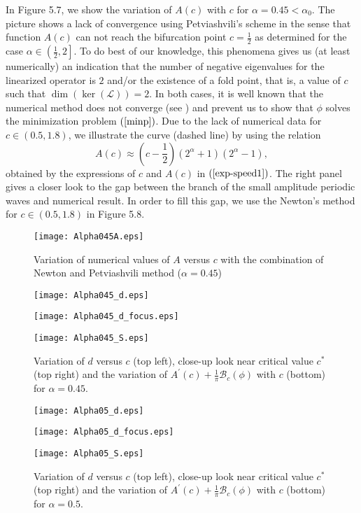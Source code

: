 \documentclass[12pt,reqno]{amsart}
\newcommand{\2}{L^2_{per}(0, T)}
\numberwithin{equation}{section}
\numberwithin{figure}{section}
\begin{document}
In Figure 5.7, we show the variation of $A(c)$ with $c$ for $\alpha=0.45 <\alpha_0$. The picture shows a lack of convergence using Petviashvili's scheme in the sense that function $A(c)$ can not reach the bifurcation point $c=\frac{1}{2}$ as determined for the case $\alpha\in\left(\frac{1}{2},2\right]$. To do best of our knowledge, this phenomena gives us (at least numerically) an indication that the number of negative eigenvalues for the linearized operator is $2$ and/or the existence of a fold point, that is, a value of $c$ such that $\dim(\ker(\mathcal{L}))=2$. In both cases, it is well known that the numerical method does not converge  (see \cite{LP, NPL,PS}) and prevent us to show that $\phi$ solves the minimization problem $(\ref{minp})$. Due to the lack of numerical data for $c\in (0.5, 1.8)$, we illustrate the curve (dashed line) by using  the
relation
\begin{equation}
A(c)\approx \left(c-\frac{1}{2}\right) (2^{\alpha}+1) (2^{\alpha}-1),  \label{rel}
\end{equation}
obtained by the expressions of $c$ and $A(c)$ in $(\ref{exp-speed1})$. The right panel gives a closer look to the gap between the branch of the small amplitude periodic waves and numerical result.   In order to fill this gap, we use the Newton's method for $c\in (0.5, 1.8)$ in Figure 5.8.
\begin{figure}
 \centering
 \texttt{[image: Alpha045A.eps]}
  \caption{Variation of numerical values of  $A$ versus $c$ with the combination of Newton and Petviashvili method ($\alpha=0.45$)}
\end{figure}

\begin{figure}[]
\begin{minipage}[t]{0.49\linewidth}
   \texttt{[image: Alpha045\_d.eps]}
 \end{minipage}
  \begin{minipage}[t]{0.49\linewidth}
   \texttt{[image: Alpha045\_d\_focus.eps]}
 \end{minipage}
 \centering
 \texttt{[image: Alpha045\_S.eps]}
 \caption{Variation of    $d$ versus $c$ (top left),  close-up look near critical value $c^*$   (top right) and the variation of $A^{\prime}(c)+\frac{1}{\pi} {\mathcal B}_c(\phi)$ with $c$ (bottom)  for $\alpha=0.45$.}
\end{figure}

\begin{figure}[]
\begin{minipage}[t]{0.49\linewidth}
   \texttt{[image: Alpha05\_d.eps]}
 \end{minipage}
  \begin{minipage}[t]{0.49\linewidth}
   \texttt{[image: Alpha05\_d\_focus.eps]}
 \end{minipage}
 \centering
 \texttt{[image: Alpha05\_S.eps]}
 \caption{Variation of    $d$ versus $c$ (top left),  close-up look near critical value $c^*$   (top right) and the variation of $A^{\prime}(c)+\frac{1}{\pi} {\mathcal B}_c(\phi)$ with $c$ (bottom)  for $\alpha=0.5$.}
\end{figure}
\end{document}
